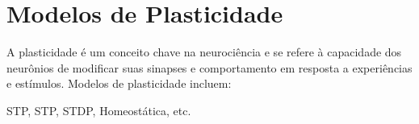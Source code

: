 \section{Modelos de Plasticidade}

A plasticidade é um conceito chave na neurociência e se refere à capacidade dos neurônios de modificar suas sinapses e
comportamento em resposta a experiências e estímulos. Modelos de plasticidade incluem:

STP, STP, STDP, Homeostática, etc.

